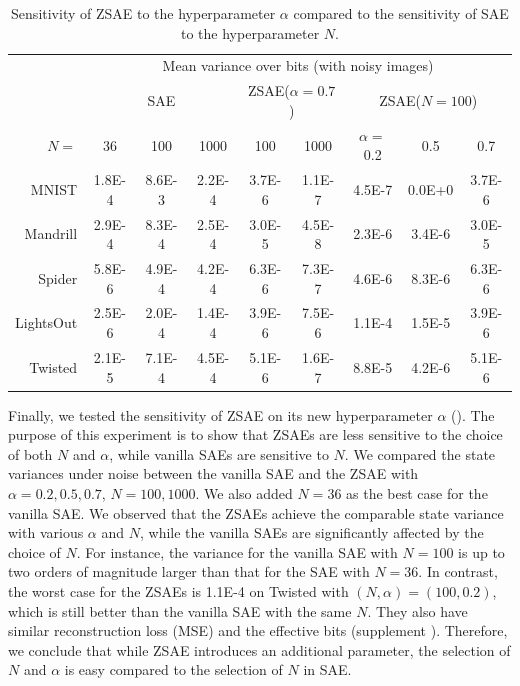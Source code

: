 \begin{table}[tb]
 \centering
 \setlength{\tabcolsep}{0.25em}
 \begin{tabular}{|r|*{8}{c|}}
     & \multicolumn{8}{c|}{Mean variance over bits (with noisy images)} \\
     & \multicolumn{3}{c|}{SAE} 
     & \multicolumn{2}{c|}{ZSAE($\alpha=0.7$)} 
     & \multicolumn{3}{c|}{ZSAE($N=100$)}
  \\
$N=$      &36     & 100    & 1000   & 100    & 1000   & $\alpha=$0.2 & 0.5    & 0.7    \\
MNIST     &1.8E-4 & 8.6E-3 & 2.2E-4 & 3.7E-6 & 1.1E-7 & 4.5E-7       & 0.0E+0 & 3.7E-6 \\
Mandrill  &2.9E-4 & 8.3E-4 & 2.5E-4 & 3.0E-5 & 4.5E-8 & 2.3E-6       & 3.4E-6 & 3.0E-5 \\
Spider    &5.8E-6 & 4.9E-4 & 4.2E-4 & 6.3E-6 & 7.3E-7 & 4.6E-6       & 8.3E-6 & 6.3E-6 \\
LightsOut &2.5E-6 & 2.0E-4 & 1.4E-4 & 3.9E-6 & 7.5E-6 & 1.1E-4       & 1.5E-5 & 3.9E-6 \\
Twisted   &2.1E-5 & 7.1E-4 & 4.5E-4 & 5.1E-6 & 1.6E-7 & 8.8E-5       & 4.2E-6 & 5.1E-6 \\
\end{tabular}
 \caption{Sensitivity of ZSAE to the hyperparameter $\alpha$ compared to the sensitivity of SAE to the hyperparameter $N$.}
 \label{sensitivity}
\end{table}

Finally, we tested the sensitivity of ZSAE on its new hyperparameter $\alpha$ ().
The purpose of this experiment is to show that ZSAEs are less sensitive to the choice of both $N$ and $\alpha$,
while vanilla SAEs are sensitive to $N$.
% 
We compared the state variances under noise
between the vanilla SAE and the ZSAE with $\alpha=0.2,0.5,0.7$, $N=100,1000$.
We also added $N=36$ as the best case for the vanilla SAE.
% 
We observed that the ZSAEs achieve the comparable state variance with various $\alpha$ and $N$,
while the vanilla SAEs are significantly affected by the choice of $N$.
For instance,
the variance for the vanilla SAE with $N=100$ is up to two orders of magnitude larger than that for the SAE with $N=36$.
In contrast,
the worst case for the ZSAEs is 1.1E-4 on Twisted with $(N,\alpha)=(100,0.2)$,
which is still better than the vanilla SAE with the same $N$.
% 
They also have similar reconstruction loss (MSE) and the effective bits (supplement ).
Therefore, we conclude that while ZSAE introduces an additional parameter,
the selection of $N$ and $\alpha$ is easy compared to the selection of $N$ in SAE.

